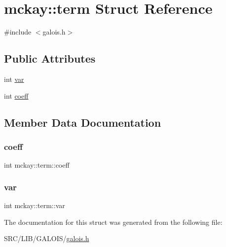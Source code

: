 \hypertarget{structmckay_1_1term}{}\section{mckay\+:\+:term Struct Reference}
\label{structmckay_1_1term}


{\ttfamily \#include $<$galois.\+h$>$}

\subsection*{Public Attributes}
\begin{DoxyCompactItemize}
\item 
int \mbox{\hyperlink{structmckay_1_1term_a6224ff0313daeeaa16801bd522d28e2b}{var}}
\item 
int \mbox{\hyperlink{structmckay_1_1term_a19347ebab54bab22a6bd47568f0f00b6}{coeff}}
\end{DoxyCompactItemize}


\subsection{Member Data Documentation}
\mbox{\label{structmckay_1_1term_a19347ebab54bab22a6bd47568f0f00b6}} 
\subsubsection{\texorpdfstring{coeff}{coeff}}
{\footnotesize\ttfamily int mckay\+::term\+::coeff}

\mbox{\label{structmckay_1_1term_a6224ff0313daeeaa16801bd522d28e2b}} 
\subsubsection{\texorpdfstring{var}{var}}
{\footnotesize\ttfamily int mckay\+::term\+::var}



The documentation for this struct was generated from the following file\+:\begin{DoxyCompactItemize}
\item 
S\+R\+C/\+L\+I\+B/\+G\+A\+L\+O\+I\+S/\mbox{\hyperlink{galois_8h}{galois.\+h}}\end{DoxyCompactItemize}
